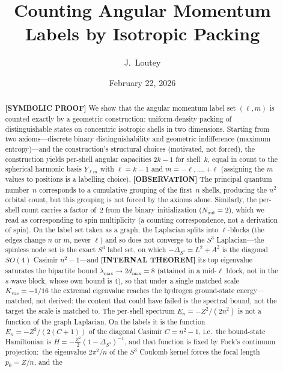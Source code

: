 \documentclass[aps,prl,reprint,amsmath,amssymb]{revtex4-2}
\newcommand{\gvc}[2]{#2}
\begin{document}
\title{Counting Angular Momentum Labels by Isotropic Packing}

\author{J.~Loutey}

\date{February 22, 2026}

\begin{abstract}
\textbf{[SYMBOLIC PROOF]} We show that the angular momentum label set $(\ell, m)$ is counted
exactly by a geometric construction: uniform-density packing of
distinguishable states on concentric isotropic shells in two
dimensions.  Starting from two axioms---discrete binary
distinguishability and geometric indifference (maximum entropy)---and
the construction's structural choices (motivated, not forced), the
construction yields per-shell angular capacities $2k-1$ for shell~$k$, equal in
count to the spherical harmonic basis $Y_{\ell m}$ with
$\ell = k - 1$ and $m = -\ell, \ldots, +\ell$ (assigning the $m$ values to
positions is a labelling choice).  \textbf{[OBSERVATION]}
The principal quantum number~$n$ corresponds to a cumulative grouping
of the first~$n$ shells, producing the $n^2$ orbital count, but this
grouping is not forced by the axioms alone.  Similarly, the per-shell
count carries a factor of~2 from the binary initialization
($N_{\mathrm{init}} = 2$), which we read as corresponding to spin
multiplicity (a counting correspondence, not a derivation of spin).  On the label set taken as a graph, the
Laplacian splits into $\ell$-blocks (the edges change
$n$ or $m$, never $\ell$) and so does not converge to the $S^3$
Laplacian---the spinless node set is the exact $S^3$ label set, on which
$-\Delta_{S^3} = L^2 + A^2$ is the diagonal $SO(4)$ Casimir
$n^2-1$---and \textbf{[INTERNAL THEOREM]} its top
eigenvalue saturates the bipartite bound $\lambda_{\max} \to 2 d_{\max} = 8$
(attained in a mid-$\ell$ block, not in the $s$-wave block, whose own
bound is 4), so that under a single matched scale
$K_{\mathrm{vac}} = -1/16$ the extremal eigenvalue reaches the hydrogen
ground-state energy---matched, not derived: the content that could have
failed is the spectral bound, not the target the scale is matched to.
\gvc{graph-s3-wall}{The per-shell spectrum $E_n = -Z^2/(2n^2)$ is not a function of the
graph Laplacian}.  On the labels it is the function
$E_n = -Z^2/(2(C+1))$ of the diagonal Casimir $C = n^2-1$, i.e.\ the
bound-state Hamiltonian is $H = -\tfrac{Z^2}{2}(1-\Delta_{S^3})^{-1}$,
and that function is fixed by Fock's continuum projection:\ the eigenvalue $2\pi^2/n$ of
the $S^3$ Coulomb kernel forces the focal length $p_0 = Z/n$, and the

\end{abstract}
\end{document}
